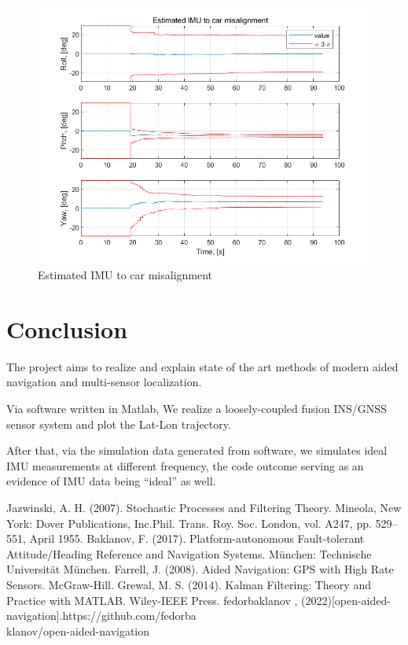 \documentclass[conference]{IEEEtran}
\begin{document}
\begin{figure}[htbp]
    \centerline{\includegraphics[width=1.0\columnwidth]{fig27.png}}
    \caption{Estimated IMU to car misalignment}
\end{figure}


\section{Conclusion}

The project aims to realize and explain state of the art methods of modern aided navigation and multi-sensor localization.

Via software written in Matlab, We realize a loosely-coupled fusion INS/GNSS sensor system and plot the Lat-Lon trajectory.

After that, via the simulation data generated from software, we simulates ideal IMU measurements at different frequency, the code outcome serving as an evidence of IMU data being “ideal” as well. 


% 
% 

\begin{thebibliography}{00}
 Jazwinski, A. H. (2007). Stochastic Processes and Filtering Theory. Mineola, New York: Dover Publications, Inc.Phil. Trans. Roy. Soc. London, vol. A247, pp. 529--551, April 1955.
 Baklanov, F. (2017). Platform-autonomous Fault-tolerant Attitude/Heading Reference and Navigation Systems. München: Technische Universität München.
 Farrell, J. (2008). Aided Navigation: GPS with High Rate Sensors. McGraw-Hill.
 Grewal, M. S. (2014). Kalman Filtering: Theory and Practice with MATLAB. Wiley-IEEE Press.
 fedorbaklanov , (2022)[open-aided-navigation].https://github.com/fedorba \\
klanov/open-aided-navigation
\end{thebibliography}
\vspace{12pt}
\end{document}

